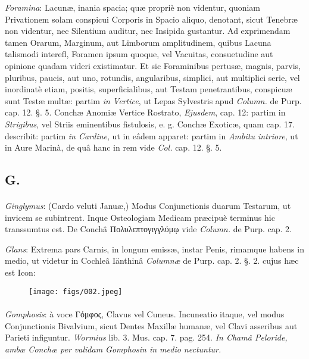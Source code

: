 \documentclass[a4paper, 11pt, oneside, polutonikogreek, german]{article}
\begin{document}
\emph{Foramina}: Lacunæ, inania spacia; quæ propriè non videntur, quoniam Privationem solam conspicui Corporis in Spacio aliquo, denotant, sicut Tenebræ non videntur, nec Silentium auditur, nec Insipida gustantur. Ad exprimendam tamen Orarum, Marginum, aut Limborum amplitudinem, quibus Lacuna talismodi interefl, Foramen ipsum quoque, vel Vacuitas, consuetudine aut opinione quadam videri existimatur. Et sic Foraminibus pertusæ, magnis, parvis, pluribus, paucis, aut uno, rotundis, angularibus, simplici, aut multiplici serie, vel inordinatè etiam, positis, superficialibus, aut Testam penetrantibus, conspicuæ sunt Testæ multæ: partim \emph{in Vertice}, ut Lepas Sylvestris apud \emph{Column.} de Purp. cap. 12. §. 5. Conchæ Anomiæ Vertice Rostrato, \emph{Ejusdem}, cap. 12: partim in \emph{Strigibus}, vel Striis eminentibus fistulosis, e. g. Conchæ Exoticæ, quam cap. 17. describit: partim \emph{in Cardine}, ut in eâdem apparet: partim in \emph{Ambitu intriore}, ut in Aure Marinà, de quâ hanc in rem vide \emph{Col.} cap. 12. §. 5.

\subsection{G.}
\paragraph{}
\emph{Ginglymus}: (Cardo veluti Januæ,) Modus Conjunctionis duarum Testarum, ut invicem se subintrent. Inque Osteologiam Medicam præcipuè terminus hic transsumtus est. De Conchâ Πολυλεπτογιγγλύμῳ vide \emph{Column.} de Purp. cap. 2.

\emph{Glans}: Extrema pars Carnis, in longum emissæ, instar Penis, rimamque habens in medio, ut videtur in Cochleâ Iänthinâ \emph{Columnæ} de Purp. cap. 2. §. 2. cujus hæc est Icon:

\begin{figure}[H]
\centering
\texttt{[image: figs/002.jpeg]}
\end{figure}
\paragraph{}
\emph{Gomphosis}: à voce Γόμφος, Clavus vel Cuneus. Incuneatio itaque, vel modus Conjunctionis Bivalvium, sicut Dentes Maxillæ humanæ, vel Clavi asseribus aut Parieti infiguntur. \emph{Wormius} lib. 3. Mus. cap. 7. pag. 254. \emph{In Chamâ Peloride, ambæ Conchæ per validam Gomphosin in medio nectuntur.}
\end{document}
